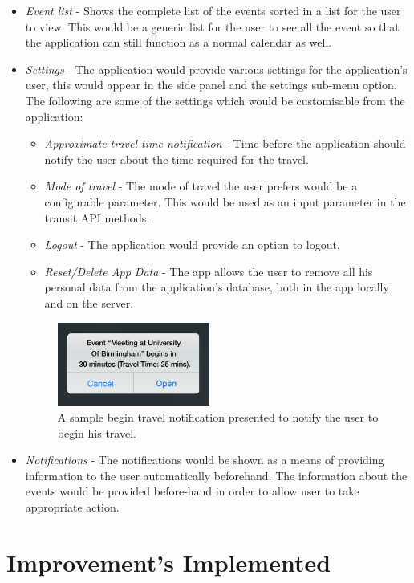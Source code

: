 \documentclass[12pt]{report}
\begin{document}
\begin{itemize}
\item \textit{Event list} - Shows the complete list of the events sorted in a list for the user to view. This would be a generic list for the user to see all the event so that the application can still function as a normal calendar as well.

\item \textit{Settings} - The application would provide various settings for the application's user, this would appear in the side panel and the settings sub-menu option. The following are some of the settings which would be customisable from the application:
\begin{itemize}
\item \textit{Approximate travel time notification} - Time before the application should notify the user about the time required for the travel.
\item \textit{Mode of travel} - The mode of travel the user prefers would be a configurable parameter. This would be used as an input parameter in the transit API methods.
\item \textit{Logout} - The application would provide an option to logout.
\item \textit{Reset/Delete App Data} - The app allows the user to remove all his personal data from the application's database, both in the app locally and on the server.
\end{itemize}
\begin{figure}[htbp]
 \centering
 \includegraphics[width=50mm]{EventNotif.png}
   \caption[Begin travel notification.]{A sample begin travel notification presented to notify the user to begin his travel.}
 \label{fgr:EventNotif}
\end{figure}
\item \textit{Notifications} - The notifications would be shown as a means of providing information to the user automatically beforehand. The information about the events would be provided before-hand in order to allow user to take appropriate action.
\end{itemize}

\section{Improvement's Implemented}
\end{document}

